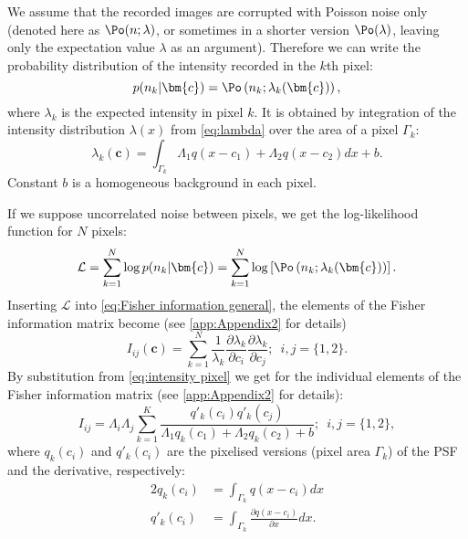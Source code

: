 We assume that the recorded images are corrupted with Poisson noise only (denoted here as $\Po(n;\lambda)$, or sometimes in a shorter version $\Po(\lambda)$, leaving only the expectation value $\lambda$ as an argument). Therefore we can write the probability distribution of the intensity recorded in the $k$th pixel:
%
\begin{equation*}
	p(n_k|\bm{c})=\Po\left(n_k;\lambda_k(\bm{c})\right),
\end{equation*}
%
where $\lambda_k$ is the expected intensity in pixel $k$. It is obtained by integration of the intensity distribution $\lambda(x)$ from \autoref{eq:lambda} over the area of a pixel $\Gamma_k$:
%
\begin{equation}
	\lambda_k(\bm{c})=\int_{\Gamma_k}\Lambda_1q(x-c_1)+\Lambda_2q(x-c_2)dx+b.	
	\label{eq:intensity pixel}
\end{equation}
%
Constant $b$ is a homogeneous background in each pixel.

If we suppose uncorrelated noise between pixels, we get the log-likelihood function for $N$ pixels: 
%
\begin{equation}
	\mathcal{L}=\sum_{k=1}^N\log p(n_k|\bm{c})=\sum_{k=1}^N\log\left[\Po\left(n_k;\lambda_k(\bm{c})\right)\right].
	\label{eq:FREM likelihood Poisson}
\end{equation}
%
Inserting $\mathcal{L}$ into \autoref{eq:Fisher information general}, the elements of the Fisher information matrix become (see \autoref{app:Appendix2} for details)
%
\begin{equation}
	I_{ij}(\bm{c})=\sum_{k=1}^N\frac{1}{\lambda_k}\frac{\partial\lambda_k}{\partial c_i}\frac{\partial\lambda_k}{\partial c_j};\; \ i,j=\{1,2\}.
	\label{eq:FI - entries}
\end{equation}
%
By substitution from \autoref{eq:intensity pixel} we get for the individual elements of the Fisher information matrix (see \autoref{app:Appendix2} for details): 
%
\begin{equation}
	I_{ij} =\Lambda_i\Lambda_j\sum_{k=1}^{K}\frac{q'_k(c_i)q'_k(c_j)}{\Lambda_1q_k(c_1)+\Lambda_2q_k(c_2)+b};\; \ i,j=\{1,2\},
	\label{eq:FI - individual}
\end{equation}
%
where $q_k(c_i)$ and $q'_k(c_i)$ are the pixelised versions (pixel area $\Gamma_k$) of the PSF and the derivative, respectively:
%
\begin{alignat*}{2}
	q_k(c_i) & =\int_{\Gamma_k}q(x-c_i)dx\\
	q'_k(c_i) & =\int_{\Gamma_k}\frac{\partial q(x-c_i)}{\partial x}dx.
\end{alignat*}
%

